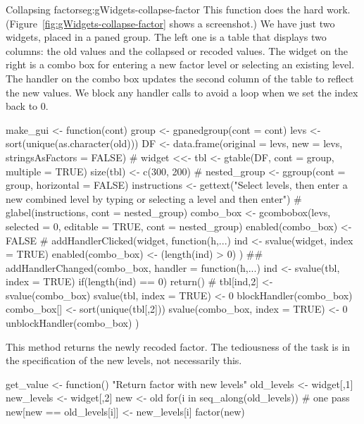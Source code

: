 \begin{example}{Collapsing factors}{eg:gWidgets-collapse-factor}
This  function does the hard
work. (Figure~\ref{fig:gWidgets-collapse-factor} shows a screenshot.)
We have just two widgets, placed in a paned group. The left one is a
table that displays two columns: the old values and the collapsed or
recoded values. The widget on the right is a combo box for entering a
new factor level or selecting an existing level. The handler on the
combo box updates the second column of the table to reflect the new
values. We block any handler calls to avoid a loop when we set the
index back to 0.
\begin{Schunk}
\begin{Sinput}
 make_gui <- function(cont) {
   group <- gpanedgroup(cont = cont)
   levs <- sort(unique(as.character(old)))
   DF <- data.frame(original = levs,
                   new = levs, stringsAsFactors = FALSE)
   #
   widget <<- tbl <- gtable(DF, cont = group,  multiple = TRUE)
   size(tbl) <- c(300, 200)
   #
   nested_group <- ggroup(cont = group, horizontal = FALSE)
   instructions <- gettext("Select levels, then\n 
 enter a new combined level\n
 by typing or selecting a level and then enter")
   #
   glabel(instructions, cont = nested_group)
   combo_box <- gcombobox(levs, selected = 0, editable = TRUE, 
                          cont = nested_group)
   enabled(combo_box) <- FALSE
   #
   addHandlerClicked(widget, function(h,...) {
     ind <- svalue(widget, index = TRUE)
     enabled(combo_box) <- (length(ind) > 0)
   })
   ##
   addHandlerChanged(combo_box, handler = function(h,...) {
     ind <- svalue(tbl, index = TRUE)
     if(length(ind) == 0) 
       return()
     #
     tbl[ind,2] <- svalue(combo_box)
     svalue(tbl, index = TRUE) <- 0
     blockHandler(combo_box)
     combo_box[] <- sort(unique(tbl[,2]))
     svalue(combo_box, index = TRUE) <- 0
     unblockHandler(combo_box)
   })
 }
\end{Sinput}
\end{Schunk}

This method returns the newly recoded factor. The tediousness of the task
is in the specification of the new levels, not necessarily this. 
\begin{Schunk}
\begin{Sinput}
 get_value <- function() {
   "Return factor with new levels"
   old_levels <- widget[,1]
   new_levels <- widget[,2]
   new <- old
   for(i in seq_along(old_levels)) # one pass
     new[new == old_levels[i]] <- new_levels[i]
   factor(new)
 }
\end{Sinput}
\end{Schunk}
%


\end{example}
